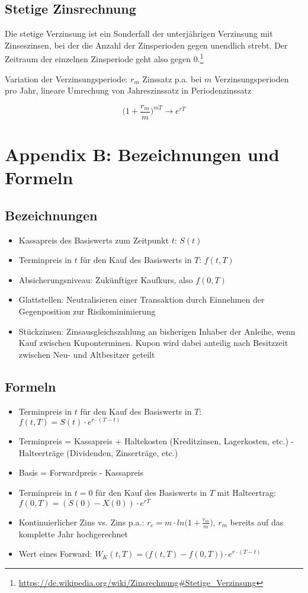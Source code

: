 \subsection{Stetige Zinsrechnung}

Die stetige Verzinsung ist ein Sonderfall der unterjährigen Verzinsung mit Zinseszinsen, bei der die Anzahl der Zinsperioden gegen unendlich strebt. Der Zeitraum der einzelnen Zinsperiode geht also gegen \(0\).\footnote{\url{https://de.wikipedia.org/wiki/Zinsrechnung\#Stetige_Verzinsung}}

Variation der Verzinsungsperiode: \(r_m\) Zinssatz p.a. bei \(m\) Verzinsungsperioden pro Jahr, lineare Umrechung von Jahreszinssatz in Periodenzinssatz

\[\Big(1+\frac{r_m}{m}\Big)^{mT} \longrightarrow e^{rT}\]


\section{Appendix B: Bezeichnungen und Formeln}

\subsection{Bezeichnungen}
\begin{itemize}
	\item Kassapreis des Basiswerts zum Zeitpunkt \(t\): \(S(t)\)
	\item Terminpreis in \(t\) für den Kauf des Basiswerts in \(T\): \(f(t,T)\)
	\item Absicherungsniveau: Zukünftiger Kaufkurs, also \(f(0,T)\)
	\item Glattstellen: Neutralisieren einer Transaktion durch Einnehmen der Gegenposition zur Risikominimierung
	\item Stückzinsen: Zinsausgleichszahlung an bisherigen Inhaber der Anleihe, wenn Kauf zwischen Kuponterminen. Kupon wird dabei anteilig nach Besitzzeit zwischen Neu- und Altbesitzer geteilt 
\end{itemize}


\subsection{Formeln}
\begin{itemize}
	\item Terminpreis in \(t\) für den Kauf des Basiswerts in \(T\): \(f(t,T) = S(t)\cdot e^{r\cdot (T-t)}\)
	\item Terminpreis = Kassapreis + Haltekosten (Kreditzinsen, Lagerkosten, etc.) - Halteerträge (Dividenden, Zinserträge, etc.)
	\item Basis = Forwardpreis - Kassapreis
	\item Terminpreis in \(t=0\) für den Kauf des Basiswerts in \(T\) mit Halteertrag: \(f(0,T) = (S(0)-X(0))\cdot e^{rT}\)
	\item Kontinuierlicher Zins vs. Zins p.a.: \(r_c = m \cdot ln\Big(1+\frac{r_m}{m}\Big)\), \(r_m\) bereits auf das komplette Jahr hochgerechnet
	\item Wert eines Forward: \(W_K(t,T) = \Big(f(t,T)-f(0,T)\Big) \cdot e^{r\cdot (T-t)}\)
\end{itemize}
